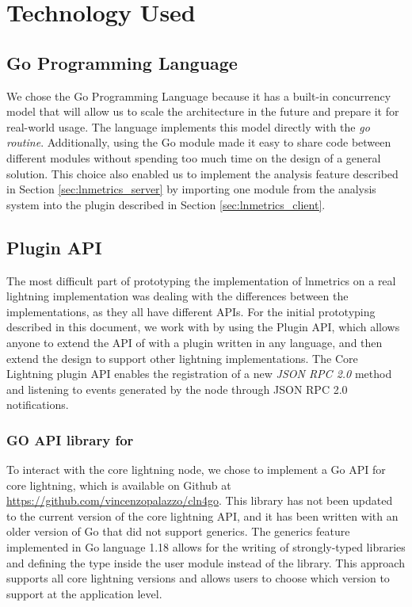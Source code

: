 \chapter{Technology Used}\label{chap:tech}

\section{Go Programming Language}

We chose the Go Programming Language because it has a built-in concurrency model that will allow 
us to scale the architecture in the future and prepare it for real-world usage. 
The language implements this model directly with the \emph{go routine}. Additionally, 
using the Go module made it easy to share code between different modules 
without spending too much time on the design of a general solution. 
This choice also enabled us to implement the analysis feature described in Section \ref{sec:lnmetrics_server} 
by importing one module from the analysis system into the plugin described in Section \ref{sec:lnmetrics_client}.

\section{{\CLN} Plugin API}

The most difficult part of prototyping the implementation of lnmetrics on a real 
lightning implementation was dealing with the differences between the implementations, 
as they all have different APIs. For the initial prototyping described in this document,
we work with {\CLN} by using the {\CLN} Plugin API, which allows 
anyone to extend the API of {\CLN} with a plugin written in any language, and then
extend the design to support other lightning implementations.
The Core Lightning plugin API enables the registration 
of a new \emph{JSON RPC 2.0}\cite{jsonrpc} method and listening to 
events generated by the node through JSON RPC 2.0 notifications.

\subsection{GO API library for {\CLN}}

To interact with the core lightning node, we chose to implement a Go API for core 
lightning, which is available on Github at \url{https://github.com/vincenzopalazzo/cln4go}. 
This library has not been updated to the current version of the core lightning 
API, and it has been written with an older version of Go that did not support generics. 
The generics feature implemented in Go language 1.18 allows for the writing of 
strongly-typed libraries and defining the type inside the user module instead of the library. 
This approach supports all core lightning versions and allows users to choose 
which version to support at the application level.

